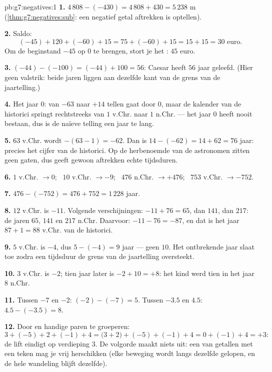 \begin{solution}{pb:g7:negatives:1}
\textbf{1.} $4\,808 - (-430) = 4\,808 + 430 = 5\,238$ m
(\cref{thm:g7:negatives:sub}: een negatief getal aftrekken is optellen).

\textbf{2.} Saldo:
\[
(-45) + 120 + (-60) + 15 = 75 + (-60) + 15 = 15 + 15 = 30
\text{ euro}.
\]
Om de beginstand $-45$ op $0$ te brengen, stort je het : $45$ euro.

\textbf{3.} $(-44) - (-100) = (-44) + 100 = 56$: Caesar heeft $56$ jaar geleefd.
(Hier geen valstrik: beide jaren liggen aan dezelfde kant van de grens van de
jaartelling.)

\textbf{4.} Het jaar $0$: van $-63$ naar $+14$ tellen gaat door $0$, maar de
kalender van de historici springt rechtstreeks van $1$ v.Chr. naar $1$ n.Chr. ---
het jaar $0$ heeft nooit bestaan, dus is de naïeve telling een jaar te lang.

\textbf{5.} $63$ v.Chr. wordt $-(63 - 1) = -62$. Dan is
$14 - (-62) = 14 + 62 = 76$ jaar: precies het cijfer van de historici. Op de
herbenoemde  van de astronomen zitten geen gaten, dus geeft gewoon aftrekken
echte tijdsduren.

\textbf{6.} $1$ v.Chr. $\to 0$; \ $10$ v.Chr. $\to -9$; \ $476$ n.Chr.
$\to +476$; \ $753$ v.Chr. $\to -752$.

\textbf{7.} $476 - (-752) = 476 + 752 = 1\,228$ jaar.

\textbf{8.} $12$ v.Chr. is $-11$. Volgende verschijningen: $-11 + 76 = 65$, dan
$141$, dan $217$: de jaren $65$, $141$ en $217$ n.Chr. Daarvoor:
$-11 - 76 = -87$, en dat is het jaar $87 + 1 = 88$ v.Chr. van de historici.

\textbf{9.} $5$ v.Chr. is $-4$, dus $5 - (-4) = 9$ jaar --- geen $10$. Het
ontbrekende jaar  slaat toe zodra een tijdsduur de grens van de jaartelling
oversteekt.

\textbf{10.} $3$ v.Chr. is $-2$; tien jaar later is $-2 + 10 = +8$: het kind werd
tien in het jaar $8$ n.Chr.

\textbf{11.} Tussen $-7$ en $-2$: $(-2) - (-7) = 5$. Tussen $-3.5$ en $4.5$:
$4.5 - (-3.5) = 8$.

\textbf{12.} Door  en handige paren te groeperen:
\[
3 + (-5) + 2 + (-1) + 4
= \bigl(3 + 2\bigr) + (-5) + (-1) + 4
= 0 + (-1) + 4 = +3 :
\]
de lift eindigt op verdieping $3$. De volgorde maakt niets uit: een  van
getallen met een teken mag je vrij herschikken (elke beweging wordt langs dezelfde
 gelopen, en de hele wandeling blijft dezelfde).


\end{solution}
